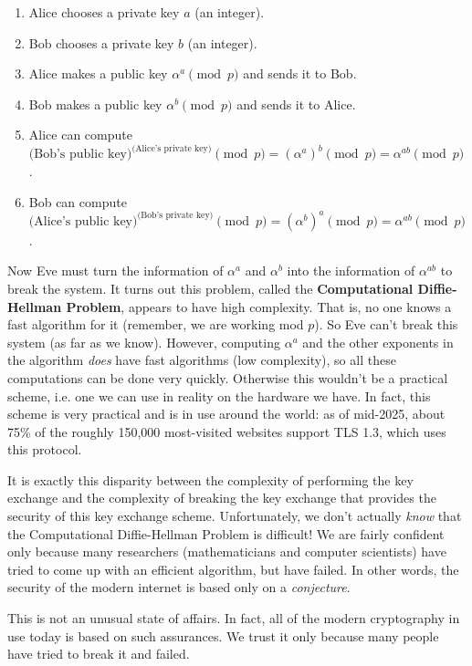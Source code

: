 \documentclass{article}
\theoremstyle{plain}
\theoremstyle{definition}
\theoremstyle{remark}
\numberwithin{theorem}{section}
\begin{document}
\begin{enumerate}
	\item Alice chooses a private key $a$ (an integer).
	\item Bob chooses a private key $b$ (an integer).
	\item Alice makes a public key $\alpha^a \pmod p$ and sends it to Bob.
	\item Bob makes a public key $\alpha^b \pmod p$ and sends it to Alice.
	\item Alice can compute $\text{(Bob's public key)}^\text{(Alice's private key)} \pmod p = (\alpha^{a})^b \pmod p = \alpha^{ab} \pmod p$.
	\item Bob can compute $\text{(Alice's public key)}^\text{(Bob's private key)} \pmod p = (\alpha^{b})^a \pmod p = \alpha^{ab} \pmod p$.
\end{enumerate}

Now Eve must turn the information of $\alpha^a$ and $\alpha^b$ into the information of $\alpha^{ab}$ to break the system.  It turns out this problem, called the \textbf{Computational Diffie-Hellman Problem}, appears to have high complexity.  That is, no one knows a fast algorithm for it (remember, we are working mod $p$).  So Eve can't break this system (as far as we know).
However, computing $\alpha^a$ and the other exponents in the algorithm \emph{does} have fast algorithms (low complexity), so all these computations can be done very quickly.  Otherwise this wouldn't be a practical scheme, i.e. one we can use in reality on the hardware we have.  In fact, this scheme is very practical and is in use around the world:  as of mid-2025, about 75\% of the roughly 150{,}000 most-visited websites support TLS 1.3, which uses this protocol. 

It is exactly this disparity between the complexity of performing the key exchange and the complexity of breaking the key exchange that provides the security of this key exchange scheme.  Unfortunately, we don't actually \emph{know} that the Computational Diffie-Hellman Problem is difficult!  We are fairly confident only because many researchers (mathematicians and computer scientists) have tried to come up with an efficient algorithm, but have failed.  In other words, the security of the modern internet is based only on a \emph{conjecture}.

This is not an unusual state of affairs.  In fact, all of the modern cryptography in use today is based on such assurances.  We trust it only because many people have tried to break it and failed.
\end{document}
